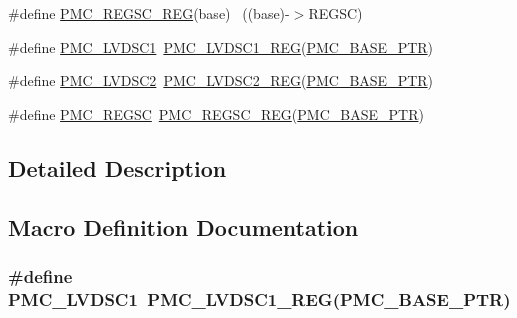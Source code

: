 \begin{DoxyCompactItemize}
\item 
\#define \hyperlink{group___p_m_c___register___accessor___macros_gababe9178e390666706c6a7f23b1dccb2}{P\+M\+C\+\_\+\+R\+E\+G\+S\+C\+\_\+\+R\+EG}(base)                                        ~((base)-\/$>$R\+E\+G\+SC)
\item 
\#define \hyperlink{group___p_m_c___register___accessor___macros_gae9e90b7b2d3c4f5e0950d074fecb2798}{P\+M\+C\+\_\+\+L\+V\+D\+S\+C1}~\hyperlink{group___p_m_c___register___accessor___macros_ga2fe280fb8b910471c6a1308e8507dd25}{P\+M\+C\+\_\+\+L\+V\+D\+S\+C1\+\_\+\+R\+EG}(\hyperlink{group___p_m_c___peripheral_gaf32df9f1096263f10a5e8978a338b2ac}{P\+M\+C\+\_\+\+B\+A\+S\+E\+\_\+\+P\+TR})
\item 
\#define \hyperlink{group___p_m_c___register___accessor___macros_ga921b48d20e5bc7e7353ac2f59c8135ba}{P\+M\+C\+\_\+\+L\+V\+D\+S\+C2}~\hyperlink{group___p_m_c___register___accessor___macros_ga4df6ab8710ac0dd4d7dd3a316de354c8}{P\+M\+C\+\_\+\+L\+V\+D\+S\+C2\+\_\+\+R\+EG}(\hyperlink{group___p_m_c___peripheral_gaf32df9f1096263f10a5e8978a338b2ac}{P\+M\+C\+\_\+\+B\+A\+S\+E\+\_\+\+P\+TR})
\item 
\#define \hyperlink{group___p_m_c___register___accessor___macros_gad80edb8f69da1769b7367108d8c4f9be}{P\+M\+C\+\_\+\+R\+E\+G\+SC}~\hyperlink{group___p_m_c___register___accessor___macros_gababe9178e390666706c6a7f23b1dccb2}{P\+M\+C\+\_\+\+R\+E\+G\+S\+C\+\_\+\+R\+EG}(\hyperlink{group___p_m_c___peripheral_gaf32df9f1096263f10a5e8978a338b2ac}{P\+M\+C\+\_\+\+B\+A\+S\+E\+\_\+\+P\+TR})
\end{DoxyCompactItemize}


\subsection{Detailed Description}


\subsection{Macro Definition Documentation}
\subsubsection[{\texorpdfstring{P\+M\+C\+\_\+\+L\+V\+D\+S\+C1}{PMC_LVDSC1}}]{\setlength{\rightskip}{0pt plus 5cm}\#define P\+M\+C\+\_\+\+L\+V\+D\+S\+C1~{\bf P\+M\+C\+\_\+\+L\+V\+D\+S\+C1\+\_\+\+R\+EG}({\bf P\+M\+C\+\_\+\+B\+A\+S\+E\+\_\+\+P\+TR})}\hypertarget{group___p_m_c___register___accessor___macros_gae9e90b7b2d3c4f5e0950d074fecb2798}{}\label{group___p_m_c___register___accessor___macros_gae9e90b7b2d3c4f5e0950d074fecb2798}


